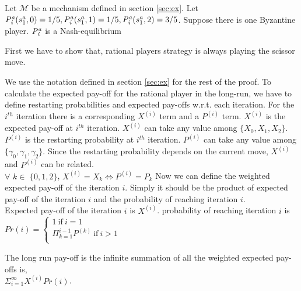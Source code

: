 \begin{theorem}\label{thm: NE}
	Let $\mathcal{M}$ be a mechanism defined in section \ref{sec:ex}.
	Let $\mathit{P^a_i}(s^a_1, 0) = 1/5, \mathit{P^a_i}(s^a_1, 1)= 1/5, \mathit{P^a_i}(s^a_1, 2) = 3/5$. Suppose there is one Byzantine player. $\mathit{P^a_i}$ is a Nash-equilibrium
\end{theorem}

First we have to show that, rational players strategy is always playing the scissor move. 

We use the notation defined in section \ref{sec:ex} for the rest of the proof.
To calculate the expected pay-off for the rational player in the long-run, we have to define restarting probabilities and expected pay-offs w.r.t. each iteration. For the $i^{th}$ iteration there is a corresponding $X^{(i)}$ term and a $P^{(i)}$ term. $X^{(i)}$ is the expected pay-off at $i^{th}$ iteration. $X^{(i)}$ can take any value among $\{ X_0, X_1, X_2 \}$.\\ $P^{(i)}$ is the restarting probability at $i^{th}$ iteration. $P^{(i)}$ can take any value among $\{ \gamma_0, \gamma_1, \gamma_2 \}$. Since the restarting probability depends on the current move, $X^{(i)}$ and $P^{(i)}$ can be related. \\
$\forall$ $k \in$ $\{0,1,2\}$, $X^{(i)}=X_k \iff P^{(i)}=P_k $ 
Now we can define the weighted expected pay-off of the iteration $i$. Simply it should be the product of expected pay-off of the iteration $i$ and the probability of reaching iteration $i$.\\
Expected pay-off of the iteration $i$ is $X^{(i)}$. probability of reaching iteration $i$ is\\

$Pr(i)=\left\{\begin{array}{l}
1\ \mbox{if}\ i=1\\
\Pi_{k=1}^{i-1}P^{(k)} \ \mbox{if}\ i>1\\
\end{array}\right. $

The long run pay-off is the infinite summation of all the weighted expected pay-offs is,\\

$\Sigma_{i=1}^{\infty} X^{(i)}Pr(i)$.\\

